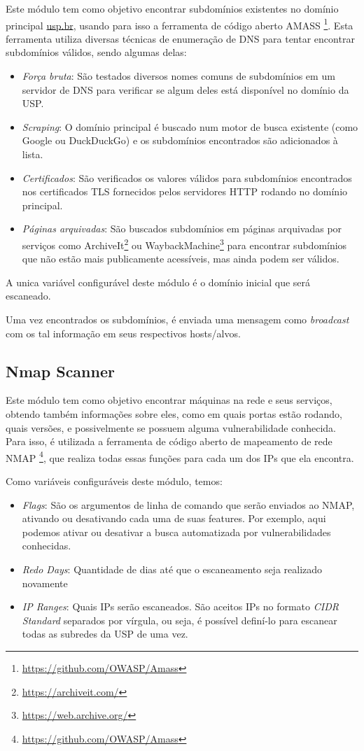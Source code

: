     Este módulo tem como objetivo encontrar subdomínios existentes no domínio principal \url{usp.br}, usando para isso a ferramenta de código aberto AMASS \footnote{\url{https://github.com/OWASP/Amass}}. Esta ferramenta utiliza diversas técnicas de enumeração de DNS para tentar encontrar subdomínios válidos, sendo algumas delas:
    \begin{itemize}
        \item \emph{Força bruta}: São testados diversos nomes comuns de subdomínios em um servidor de DNS para verificar se algum deles está disponível no domínio da USP.
        \item \emph{Scraping}: O domínio principal é buscado num motor de busca existente (como Google ou DuckDuckGo) e os subdomínios encontrados são adicionados à lista.
        \item \emph{Certificados}: São verificados os valores válidos para subdomínios encontrados nos certificados TLS fornecidos pelos servidores HTTP rodando no domínio principal.
        \item \emph{Páginas arquivadas}: São buscados subdomínios em páginas arquivadas por serviços como ArchiveIt\footnote{\url{https://archiveit.com/}} ou WaybackMachine\footnote{\url{https://web.archive.org/}} para encontrar subdomínios que não estão mais publicamente acessíveis, mas ainda podem ser válidos.
    \end{itemize}
    
    A unica variável configurável deste módulo é o domínio inicial que será escaneado.
    
    Uma vez encontrados os subdomínios, é enviada uma mensagem como \textit{broadcast} com os tal informação em seus respectivos hosts/alvos.
    \subsection{Nmap Scanner}
    Este módulo tem como objetivo encontrar máquinas na rede e seus serviços, obtendo também informações sobre eles, como em quais portas estão rodando, quais versões, e possivelmente se possuem alguma vulnerabilidade conhecida. Para isso, é utilizada a ferramenta de código aberto de mapeamento de rede NMAP \footnote{\url{https://github.com/OWASP/Amass}}, que realiza todas essas funções para cada um dos IPs que ela encontra.
    
    Como variáveis configuráveis deste módulo, temos:
    \begin{itemize}
        \item \emph{Flags}: São os argumentos de linha de comando que serão enviados ao NMAP, ativando ou desativando cada uma de suas features. Por exemplo, aqui podemos ativar ou desativar a busca automatizada por vulnerabilidades conhecidas.
        \item \emph{Redo Days}: Quantidade de dias até que o escaneamento seja realizado novamente
        \item \emph{IP Ranges}: Quais IPs serão escaneados. São aceitos IPs no formato \textit{CIDR Standard} separados por vírgula, ou seja, é possível definí-lo para escanear todas as subredes da USP de uma vez.
    \end{itemize}
    
